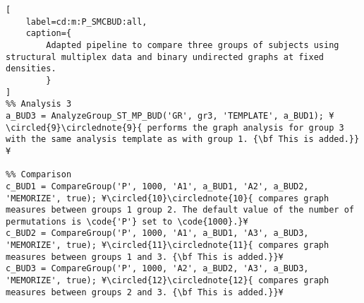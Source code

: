 \documentclass{tufte-handout}
\begin{document}
\begin{lstlisting}[
	label=cd:m:P_SMCBUD:all,
	caption={
		Adapted pipeline to compare three groups of subjects using structural multiplex data and binary undirected graphs at fixed densities.
		}
]
%% Analysis 3
a_BUD3 = AnalyzeGroup_ST_MP_BUD('GR', gr3, 'TEMPLATE', a_BUD1); ¥\circled{9}\circlednote{9}{ performs the graph analysis for group 3 with the same analysis template as with group 1. {\bf This is added.}}¥

%% Comparison
c_BUD1 = CompareGroup('P', 1000, 'A1', a_BUD1, 'A2', a_BUD2, 'MEMORIZE', true); ¥\circled{10}\circlednote{10}{ compares graph measures between groups 1 group 2. The default value of the number of permutations is \code{'P'} set to \code{1000}.}¥
c_BUD2 = CompareGroup('P', 1000, 'A1', a_BUD1, 'A3', a_BUD3, 'MEMORIZE', true); ¥\circled{11}\circlednote{11}{ compares graph measures between groups 1 and 3. {\bf This is added.}}¥
c_BUD3 = CompareGroup('P', 1000, 'A2', a_BUD2, 'A3', a_BUD3, 'MEMORIZE', true); ¥\circled{12}\circlednote{12}{ compares graph measures between groups 2 and 3. {\bf This is added.}}¥
\end{lstlisting}
\end{document}
